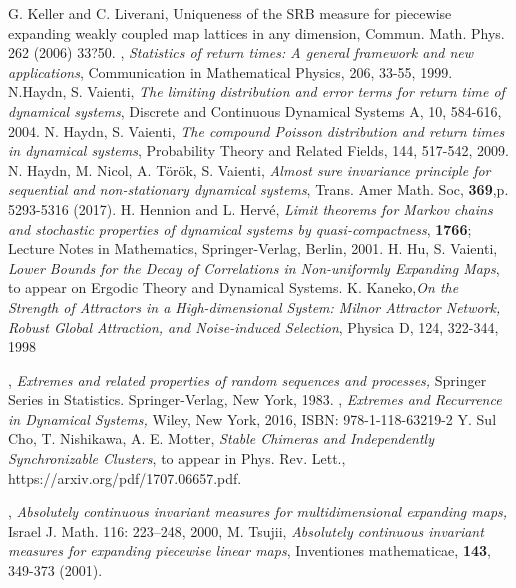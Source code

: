 \documentclass[12pt,reqno,a4paper]{amsart}
\begin{document}
\begin{thebibliography}{PGB}
 G. Keller and C. Liverani, Uniqueness of the SRB measure for piecewise expanding weakly coupled map lattices in any dimension, Commun. Math. Phys. 262 (2006) 33?50.
, \emph{ Statistics of return times: A general framework and new applications},  Communication in Mathematical Physics, 206, 33-55, 1999.
 {N.Haydn, S. Vaienti}, \emph{The limiting distribution and error terms for return time of dynamical systems},  Discrete and  Continuous Dynamical Systems A,  10, 584-616, 2004.
 {N. Haydn, S. Vaienti}, \emph{The compound Poisson distribution and return times in dynamical systems},  Probability Theory and Related Fields,  144,   517-542, 2009.
 {N.  Haydn, M. Nicol, A. T\"or\"ok, S. Vaienti}, {\em Almost sure invariance principle for sequential and non-stationary dynamical systems},  Trans. Amer Math. Soc,  {\bf 369},p. 5293-5316 (2017).
 {H. Hennion and L. Herv\'e}, {\em Limit theorems for Markov chains and stochastic properties of dynamical systems by quasi-compactness}, {\bf 1766}; Lecture Notes in Mathematics,
Springer-Verlag, Berlin, 2001.
 {H. Hu, S. Vaienti}, {\em Lower Bounds for the Decay of Correlations in Non-uniformly Expanding Maps}, to appear on Ergodic Theory and Dynamical Systems.
     {K. Kaneko},\emph {On the Strength of Attractors in a
High-dimensional System: Milnor Attractor
Network, Robust Global Attraction, and
Noise-induced Selection}, Physica D, 124, 322-344, 1998
      	
      	,
      	\emph{Extremes and related properties of random sequences and processes,}
      	Springer Series in Statistics. Springer-Verlag, New York, 1983.
      	,
      	\emph{Extremes and Recurrence in Dynamical Systems,}
      	Wiley, New York, 2016, ISBN: 978-1-118-63219-2
 {Y. Sul Cho, T. Nishikawa, A. E. Motter}, \emph{Stable Chimeras and Independently Synchronizable Clusters}, to appear in Phys. Rev. Lett., https://arxiv.org/pdf/1707.06657.pdf.

      	
      	,
      	\emph{Absolutely continuous invariant measures for multidimensional expanding maps,}
      	Israel J. Math. 116: 223–248, 2000,
 {M. Tsujii}, {\em Absolutely continuous invariant measures for expanding piecewise linear maps}, Inventiones mathematicae, {\bf 143}, 349-373 (2001).
      \end{thebibliography}
\end{document}
